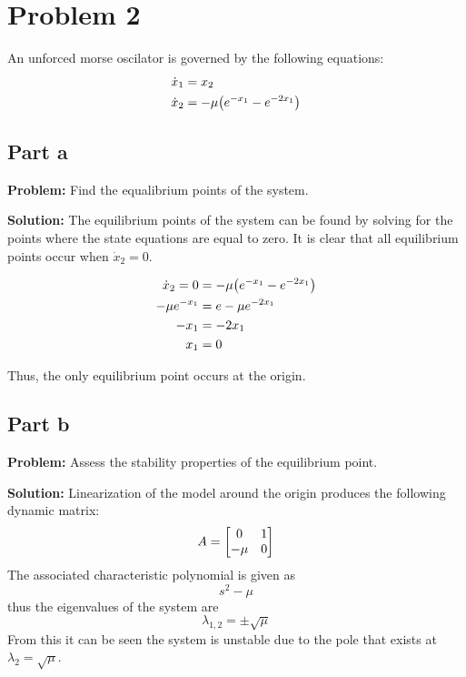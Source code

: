\documentclass[letter]{article}
\begin{document}
\newpage
\section{Problem 2}
An unforced morse oscilator is governed by the following equations:
\begin{equation}
	\begin{aligned}
		\dot{x}_1 &= x_2\\
		\dot{x}_2 &= - \mu \qty(e^{-x_1} - e^{-2x_1})
	\end{aligned}
\end{equation}

\subsection{Part a}
\textbf{Problem:}
Find the equalibrium points of the system.

\noindent
\textbf{Solution:}
The equilibrium points of the system can be found by solving for the points where the state equations are equal to zero.
It is clear that all equilibrium points occur when $\dot{x}_2 = 0$.

\begin{align}
	\dot{x}_2 = 0 &= - \mu \qty(e^{-x_1} - e^{-2x_1})\\
	-\mu e^{-x_1} &= e -\mu e^{-2x_1}\\
	-x_1 &= -2x_1\\
	x_1 &= 0
\end{align}

Thus, the only equilibrium point occurs at the origin.

\subsection{Part b}
\textbf{Problem:}
Assess the stability properties of the equilibrium point.

\noindent
\textbf{Solution:}
Linearization of the model around the origin produces the following dynamic matrix:
\begin{equation}
	A = \mqty[	0 & 1\\
				-\mu & 0]
\end{equation}
The associated characteristic polynomial is given as $$s^2 - \mu$$ thus the eigenvalues of the system are $$\lambda_{1,2} = \pm \sqrt{\mu}$$
From this it can be seen the system is unstable due to the pole that exists at $\lambda_2 = \sqrt{\mu}$.


\newpage
\end{document}
